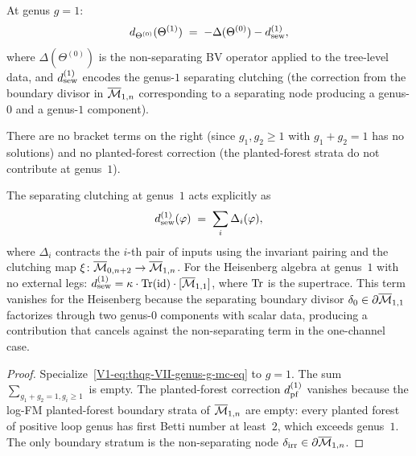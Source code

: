 \begin{proposition}
\label{prop:thqg-VII-genus1}
At genus $g = 1$:
\begin{equation}%
d_{\Theta^{(0)}}(\Theta^{(1)})
\;=\;
-\Delta(\Theta^{(0)})
- \dsew^{(1)},
\end{equation}
where $\Delta(\Theta^{(0)})$ is the non-separating BV operator
applied to the tree-level data, and $d_{\mathrm{sew}}^{(1)}$ encodes the
genus-$1$ separating clutching (the correction from the boundary
divisor in $\overline{\mathcal{M}}_{1,n}$ corresponding to a separating
node producing a genus-$0$ and a genus-$1$ component).

There are no bracket terms on the right
(since $g_1, g_2 \geq 1$ with $g_1 + g_2 = 1$ has no solutions)
and no planted-forest correction (the planted-forest
strata do not contribute at genus~$1$).

The separating clutching at genus~$1$ acts explicitly as
\begin{equation}%
\dsew^{(1)}(\varphi)
\;=\;
\sum_i \Delta_i(\varphi),
\end{equation}
where $\Delta_i$ contracts the $i$-th pair of inputs using
the invariant pairing and the clutching map
$\xi \colon \overline{\mathcal{M}}_{0,n+2} \to \overline{\mathcal{M}}_{1,n}$.
For the Heisenberg algebra at genus~$1$ with no external legs:
$d_{\mathrm{sew}}^{(1)} = \kappa \cdot \operatorname{Tr}(\mathrm{id}) \cdot [\overline{\mathcal{M}}_{1,1}]$,
where $\operatorname{Tr}$ is the supertrace. This term vanishes for the Heisenberg
because the separating boundary divisor
$\delta_0 \in \partial\overline{\mathcal{M}}_{1,1}$ factorizes through two
genus-$0$ components with scalar data, producing a contribution
that cancels against the non-separating term in the one-channel case.
\end{proposition}

\begin{proof}
Specialize~\eqref{V1-eq:thqg-VII-genus-g-mc-eq} to $g = 1$. The
sum $\sum_{g_1+g_2=1, g_i \geq 1}$ is empty.
The planted-forest correction $d_{\mathrm{pf}}^{(1)}$ vanishes because
the log-FM planted-forest boundary strata of
$\overline{\mathcal{M}}_{1,n}$ are empty: every planted forest of
positive loop genus has first Betti number at least~$2$,
which exceeds genus~$1$. The only boundary stratum is the
non-separating node
$\delta_{\mathrm{irr}} \in \partial\overline{\mathcal{M}}_{1,n}$.
\end{proof}

